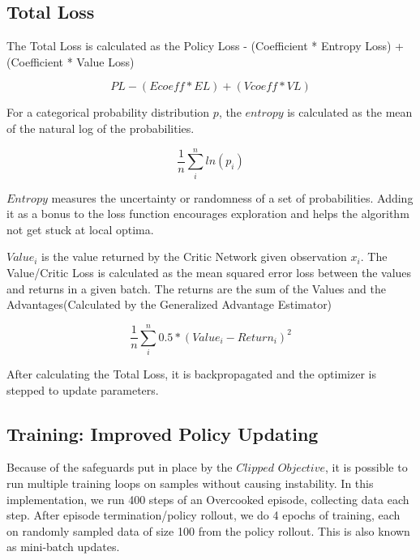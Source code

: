 \documentclass[conference]{IEEEtran}
\begin{document}
\subsection{Total Loss}
The Total Loss is calculated as the Policy Loss - (Coefficient * Entropy Loss) + (Coefficient * Value Loss)

\begin{equation}
    PL - (Ecoeff * EL) + (Vcoeff * VL)
\end{equation}

For a categorical probability distribution $p$, the $\textit{entropy}$ is calculated as the mean of the natural log of the probabilities.

\begin{equation}
    \frac{1}{n} \sum_i^n ln(p_i)
\end{equation}

$\textit{Entropy}$ measures the uncertainty or randomness of a set of probabilities. Adding it as a bonus to the loss function 
encourages exploration and helps the algorithm not get stuck at local optima. \par
$\textit{Value}_i$ is the value returned by the Critic Network given observation $x_i$. The Value/Critic Loss is calculated as the mean squared error loss between the values
and returns in a given batch. The returns are the sum of the Values and the Advantages(Calculated by the Generalized Advantage Estimator)

\begin{equation}
    \frac{1}{n} \sum_i^n 0.5 * (Value_i - Return_i)^2
\end{equation}

After calculating the Total Loss, it is backpropagated and the optimizer is stepped to update parameters. 

\subsection{Training: Improved Policy Updating}
Because of the safeguards put in place by the $\textit{Clipped Objective}$, it is possible to run multiple training loops on samples
without causing instability. In this implementation, we run 400 steps of an Overcooked episode, collecting data each step. 
After episode termination/policy rollout, we do 4 epochs of training, each on randomly sampled data of size 100 from the policy rollout. This is also 
known as mini-batch updates. 
\end{document}
